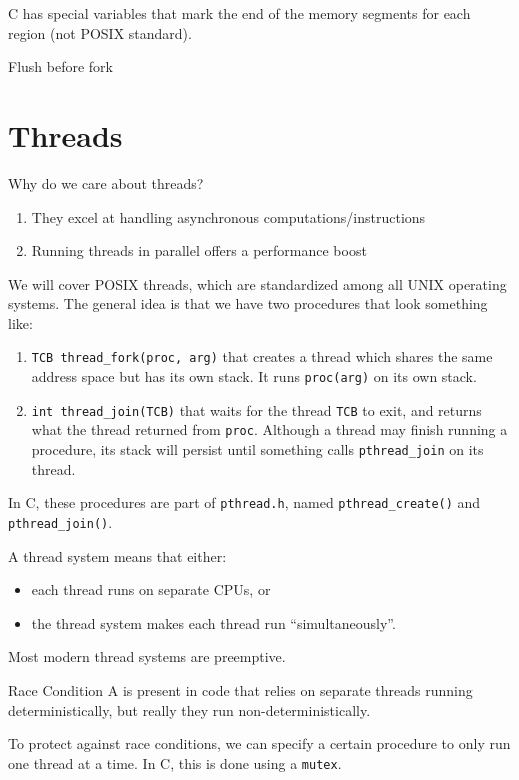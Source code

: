 \documentclass[code]{amznotes}
\begin{document}
C has special variables that mark the end of the memory segments for each region (not POSIX standard).

\begin{notebox}
    Flush before fork
\end{notebox}

\chapter{Threads}

Why do we care about threads?
\begin{enumerate}
    \item They excel at handling asynchronous computations/instructions
    \item Running threads in parallel offers a performance boost
\end{enumerate}

We will cover POSIX threads, which are standardized among all UNIX operating systems. The general idea is that we have two procedures that look something like:
\begin{enumerate}
    \item \texttt{TCB thread\_fork(proc, arg)} that creates a thread which shares the same address space but has its own stack. It runs \texttt{proc(arg)} on its own stack.
    \item \texttt{int thread\_join(TCB)} that waits for the thread \texttt{TCB} to exit, and returns what the thread returned from \texttt{proc}. Although a thread may finish running a procedure, its stack will persist until something calls \texttt{pthread\_join} on its thread.
\end{enumerate}

In C, these procedures are part of \texttt{pthread.h}, named \texttt{pthread\_create()} and \texttt{pthread\_join()}.

A  thread system means that either:
\begin{itemize}[noitemsep]
    \item each thread runs on separate CPUs, or
    \item the thread system makes each thread run ``simultaneously''.
\end{itemize}

Most modern thread systems are preemptive.

\begin{dfnbox}{Race Condition}{}
    A  is present in code that relies on separate threads running deterministically, but really they run non-deterministically.
\end{dfnbox}

To protect against race conditions, we can specify a certain procedure to only run one thread at a time. In C, this is done using a \texttt{mutex}.

\amzindex
\end{document}
